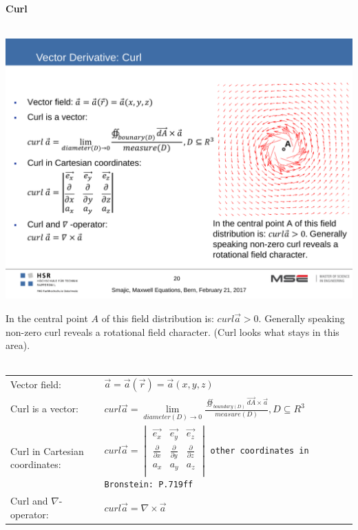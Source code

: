 \textbf{\\ \\ Curl\\ \\}
\begin{minipage}[lt]{5cm}
	\includegraphics[width=.8\textwidth]{./images/Curl.pdf}
\end{minipage}
\begin{minipage}[rt]{13cm}
	In the central point $A$ of this field distribution is: $curl \vec{a} > 0$. Generally speaking non-zero curl reveals a rotational field character. (Curl looks what stays in this area).\\ \\
	\begin{tabular}{ll}
		Vector field: & $\vec{a} = \vec{a}\left(\vec{r}\right) = \vec{a}\left(x,y,z\right)$\\
		Curl is a vector: & $curl \vec{a} = \lim\limits_{diameter\left(D\right)\rightarrow 0} \frac{\oiint_{boundary\left(D\right)} \vec{dA} \times \vec{a}}{measure\left(D\right)}, D\subseteq R^3$\\
		Curl in Cartesian coordinates: & $curl \vec{a} = 
		\begin{vmatrix}
			\vec{e_x} & \vec{e_y} & \vec{e_z} \\
			\frac{\partial}{\partial x} & \frac{\partial}{\partial y} & \frac{\partial}{\partial z} \\
			a_x & a_y & a_z \\
		\end{vmatrix}$ {\tiny \texttt{other coordinates in Bronstein: P.719ff}}\\
		Curl and $\nabla$-operator: & $curl \vec{a} = \nabla \times \vec{a}$\\
	\end{tabular}
\end{minipage}


